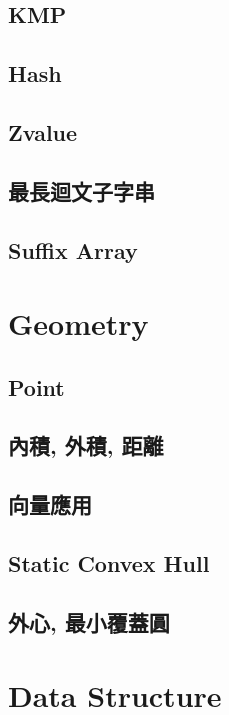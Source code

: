 \subsection{KMP} 

\subsection{Hash} 

\subsection{Zvalue} 

\subsection{最長迴文子字串} 

\subsection{Suffix Array} 


\section{Geometry}
\subsection{Point} 

\subsection{內積, 外積, 距離} 

\subsection{向量應用} 

\subsection{Static Convex Hull} 

\subsection{外心, 最小覆蓋圓} 


\section{Data Structure}
